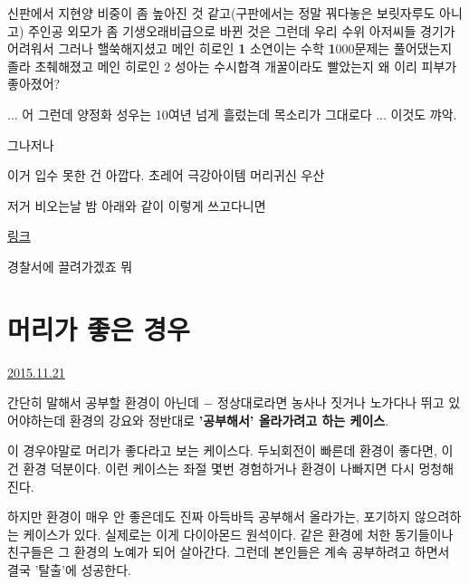 신판에서 지현양 비중이 좀 높아진 것 같고(구판에서는 정말 꿔다놓은 보릿자루도 아니고)
주인공 외모가 좀 기생오래비급으로 바뀐 것은 그런데 우리 수위 아저씨들 경기가 어려워서 그러나 핼쑥해지셨고
메인 히로인 \textbf{1} 소연이는 수학 \textbf{1}000문제는 풀어댔는지 졸라 초췌해졌고
메인 히로인 2 성아는 수시합격 개꿀이라도 빨았는지 왜 이리 피부가 좋아졌어?
\vspace{5mm}

...  어 그런데 양정화 성우는 10여년 넘게 흘렀는데 목소리가 그대로다 ... 이것도 꺄악.
\vspace{5mm}

그나저나
\vspace{5mm}

이거 입수 못한 건 아깝다.
초레어 극강아이템 머리귀신 우산
\vspace{5mm}

저거 비오는날 밤 아래와 같이 이렇게 쓰고다니면
\vspace{5mm}

\href{http://gall.dcinside.com/board/view/?id=fantasy$\_$new&no=3200399&page=1&search$\_$pos=&s$\_$type=search$\_$all&s$\_$keyword=%ED%99%94%EC%9D%B4%ED%8A%B8}{링크}
\vspace{5mm}

경찰서에 끌려가겠죠 뭐
\vspace{5mm}










\section{머리가 좋은 경우}
\href{https://www.kockoc.com/Apoc/504246}{2015.11.21}

\vspace{5mm}

간단히 말해서
공부할 환경이 아닌데 $-$ 정상대로라면 농사나 짓거나 노가다나 뛰고 있어야하는데
환경의 강요와 정반대로 \textbf{'공부해서' 올라가려고 하는 케이스}.
\vspace{5mm}

이 경우야말로 머리가 좋다라고 보는 케이스다.
두뇌회전이 빠른데 환경이 좋다면, 이건 환경 덕분이다.
이런 케이스는 좌절 몇번 경험하거나 환경이 나빠지면 다시 멍청해진다.
\vspace{5mm}

하지만 환경이 매우 안 좋은데도 진짜 아득바득 공부해서 올라가는, 포기하지 않으려하는 케이스가 있다.
실제로는 이게 다이아몬드 원석이다.
같은 환경에 처한 동기들이나 친구들은 그 환경의 노예가 되어 살아간다.
그런데 본인들은 계속 공부하려고 하면서 결국 '탈출'에 성공한다.
\vspace{5mm}

